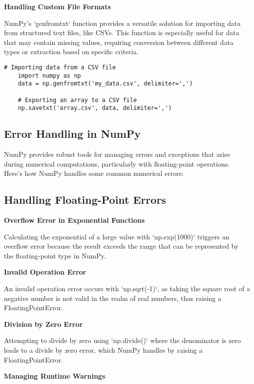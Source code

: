 \textbf{Handling Custom File Formats}

NumPy's `genfromtxt` function provides a versatile solution for importing data from structured text files, like CSVs. This function is especially useful for data that may contain missing values, requiring conversion between different data types or extraction based on specific criteria.

\begin{lstlisting}[caption={Example code to import and export data using NumPy with CSV files}, label={code:numpy-csv-import-export}, style=pythonstyle]
	# Importing data from a CSV file
	import numpy as np
	data = np.genfromtxt('my_data.csv', delimiter=',')
	
	# Exporting an array to a CSV file
	np.savetxt('array.csv', data, delimiter=',')
\end{lstlisting}

\subsection{Error Handling in NumPy}

NumPy provides robust tools for managing errors and exceptions that arise during numerical computations, particularly with floating-point operations. Here's how NumPy handles some common numerical errors:

\subsection{Handling Floating-Point Errors}

\textbf{Overflow Error in Exponential Functions}

Calculating the exponential of a large value with `np.exp(1000)` triggers an overflow error because the result exceeds the range that can be represented by the floating-point type in NumPy.

\textbf{Invalid Operation Error}

An invalid operation error occurs with `np.sqrt(-1)`, as taking the square root of a negative number is not valid in the realm of real numbers, thus raising a FloatingPointError.

\textbf{Division by Zero Error}

Attempting to divide by zero using `np.divide()` where the denominator is zero leads to a divide by zero error, which NumPy handles by raising a FloatingPointError.

\textbf{Managing Runtime Warnings}

